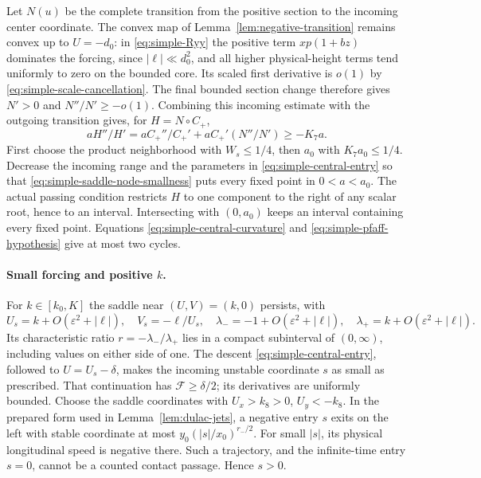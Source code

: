 Let $N(u)$ be the complete transition from the positive section to the
incoming center coordinate.  The convex map of
Lemma~\ref{lem:negative-transition} remains convex up to $U=-d_0$:
in \eqref{eq:simple-Ryy} the positive term $xp(1+bz)$ dominates
the forcing, since $|\ell|\ll d_0^2$, and all higher physical-height
terms tend uniformly to zero on the bounded core.
Its scaled first derivative is $o(1)$ by
\eqref{eq:simple-scale-cancellation}.  The final bounded section
change therefore gives $N'>0$ and $N''/N'\ge-o(1)$.
Combining this incoming estimate with the outgoing transition gives,
for $H=N\circ C_+$,
\begin{equation}\label{eq:simple-central-curvature}
 aH''/H'=aC_+''/C_+'+aC_+'(N''/N')\ge-K_7a.
\end{equation}
First choose the product neighborhood with $W_s\le1/4$, then
$a_0$ with $K_7a_0\le1/4$.  Decrease the incoming range and the
parameters in \eqref{eq:simple-central-entry} so that
\eqref{eq:simple-saddle-node-smallness} puts every fixed point in
$0<a<a_0$.  The actual passing condition restricts $H$ to one component
to the right of any scalar root, hence to an interval.  Intersecting
with $(0,a_0)$ keeps an interval containing every fixed point.
Equations \eqref{eq:simple-central-curvature} and
\eqref{eq:simple-pfaff-hypothesis} give at most two cycles.

\paragraph{Small forcing and positive $k$.}
For $k\in[k_0,K]$ the saddle near $(U,V)=(k,0)$ persists, with
\[
 U_s=k+O(\varepsilon^2+|\ell|),\quad V_s=-\ell/U_s,
 \quad\lambda_-=-1+O(\varepsilon^2+|\ell|),\quad
 \lambda_+=k+O(\varepsilon^2+|\ell|).
\]
Its characteristic ratio $r=-\lambda_-/\lambda_+$ lies in a compact
subinterval of $(0,\infty)$, including values on either side of one.
The descent \eqref{eq:simple-central-entry}, followed to
$U=U_s-\delta$, makes the incoming unstable coordinate $s$ as small
as prescribed.  That continuation has $\mathcal F\ge\delta/2$;
its derivatives are uniformly bounded.
Choose the saddle coordinates with $U_x>k_8>0$, $U_y<-k_8$.
In the prepared form used in Lemma~\ref{lem:dulac-jets}, a negative
entry $s$ exits on the left with stable coordinate at most
$y_0(|s|/x_0)^{r_-/2}$.  For small $|s|$, its physical longitudinal
speed is negative there.  Such a trajectory, and the infinite-time
entry $s=0$, cannot be a counted contact passage.  Hence $s>0$.

